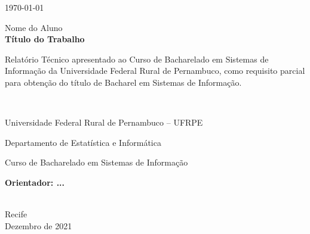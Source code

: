 \begin{titlepage}
\begin{center}
\vfill

{\large \today}
\end{center}

%

{\center
{\large Nome do Aluno}\\[3cm]
{\Large \bf Título do Trabalho}\\[2.0cm]


{\raggedleft
\begin{minipage}[t]{8.3cm}
\setlength{\baselineskip}{0.25in}
Relatório Técnico apresentado ao Curso de Bacharelado em Sistemas de Informação da Universidade Federal Rural de Pernambuco, como requisito parcial para obtenção do título de Bacharel em Sistemas de Informação.
\end{minipage}\\[2cm]}

\begin{center}
	Universidade Federal Rural de Pernambuco -- UFRPE
  	\par
  	Departamento de Estatística e Informática
    \par
  	Curso de Bacharelado em Sistemas de Informação
\end{center}

\vspace{3cm}
{\large \bf{Orientador:} ...}}\\[2.0cm]

\vspace{2cm}
{\center Recife \\[2mm]
Dezembro  de 2021 \\}






\end{titlepage}